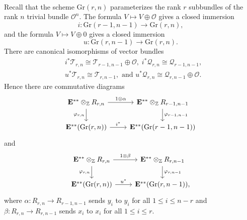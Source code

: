 \documentclass[11pt, a4paper]{amsart}
\theoremstyle{definition}
\numberwithin{equation}{subsection}
\newcommand{\Z}{\mathbb{Z}}
\newcommand{\Gr}{{\mathrm{Gr}}}
\newcommand{\cO}{\mathcal{O}}
\newcommand{\cQ}{\mathcal{Q}}
\newcommand{\cT}{\mathcal{T}}
\newcommand{\ringE}{\mathbf{E}}
\begin{document}
\

Recall that the scheme $\Gr(r,n)$ parameterizes the rank $r$ subbundles of the rank $n$ trivial bundle $\cO^n$.
The formula $V\mapsto V\oplus \cO$ gives a closed immersion
\begin{equation}
\label{Ori.7.1}
i\colon \Gr(r-1,n-1)\to \Gr(r,n),
\end{equation}
and the formula $V\mapsto V\oplus 0$ gives a closed immersion
\begin{equation}
\label{Ori.7.7}
u\colon \Gr(r,n-1)\to \Gr(r,n).
\end{equation}
There are canonical isomorphisms of vector bundles
\begin{equation}
\label{Ori.7.10}
\begin{split}
&i^*\cT_{r,n} \cong \cT_{r-1,n-1}\oplus \cO,
\;
i^*\cQ_{r,n} \cong \cQ_{r-1,n-1},
\\
&u^*\cT_{r,n} \cong \cT_{r,n-1},
\text{ and }
u^*\cQ_{r,n} \cong \cQ_{r,n-1}\oplus \cO.
\end{split}
\end{equation}
Hence there are commutative diagrams
\begin{equation}
\label{Ori.7.5}
\begin{tikzcd}
\ringE^{**}\otimes_{\Z} R_{r,n}\ar[r,"1\otimes \alpha"]\ar[d,"\varphi_{r,n}"']&
\ringE^{**}\otimes_{\Z} R_{r-1,n-1}\ar[d,"\varphi_{r-1,n-1}"]
\\
\ringE^{**}(\Gr(r,n))\ar[r,"i^*"]&
\ringE^{**}(\Gr(r-1,n-1))
\end{tikzcd}
\end{equation}
and
\begin{equation}
\label{Ori.7.6}
\begin{tikzcd}
\ringE^{**}\otimes_{\Z} R_{r,n}\ar[r,"1\otimes \beta"]\ar[d,"\varphi_{r,n}"']&
\ringE^{**}\otimes_{\Z} R_{r,n-1}\ar[d,"\varphi_{r,n-1}"]
\\
\ringE^{**}(\Gr(r,n))\ar[r,"u^*"]&
\ringE^{**}(\Gr(r,n-1)),
\end{tikzcd}
\end{equation}
where $\alpha\colon R_{r,n}\to R_{r-1,n-1}$ sends $y_i$ to $y_i$ for all $1\leq i\leq n-r$ and $\beta\colon R_{r,n}\to R_{r,n-1}$ sends $x_i$ to $x_i$ for all $1\leq i\leq r$.
\end{document}
